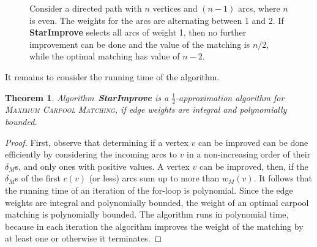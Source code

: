 \documentclass[11pt]{article}
\newtheorem{theorem}{Theorem}
\newcommand{\half}{\frac{1}{2}}
\newcommand{\carpool}{\textsc{Maximum Carpool Matching}\xspace}
\begin{document}
\begin{figure}[t]
\centering
{}
\caption{
%
Consider a directed path with $n$ vertices and $(n-1)$ arcs, where $n$
is even.  The weights for the arcs are alternating between 1 and 2.
%
If \textbf{StarImprove} selects all arcs of weight 1, then no further
improvement can be done and the value of the matching is $n/2$,
while the optimal matching has value of $n-2$.}
\label{fig:grd worst}
\end{figure}

It remains to consider the running time of the algorithm.

\begin{theorem}
\label{thm:improve-bounded}
Algorithm~\textbf{StarImprove} is a $\half$-approximation algorithm
for \carpool, if edge weights are integral and polynomially bounded.
\end{theorem}
\begin{proof}
First, observe that determining if a vertex $v$ can be improved can be
done efficiently by considering the incoming arcs to $v$ in a
non-increasing order of their $\delta_M$s, and only ones with positive
values.  A vertex $v$ can be improved, then, if the $\delta_M$s of the
first $c(v)$ (or less) arcs sum up to more than $w_M(v)$.
%
It follows that the running time of an iteration of the for-loop is
polynomial.  Since the edge weights are integral and polynomially
bounded, the weight of an optimal carpool matching is polynomially
bounded.  The algorithm runs in polynomial time, because in each
iteration the algorithm improves the weight of the matching by at
least one or otherwise it terminates.
\end{proof}
\end{document}
